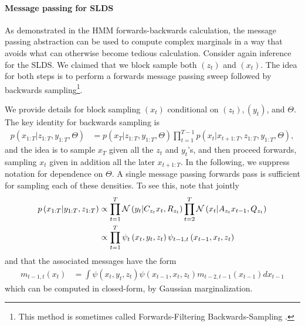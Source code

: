 \paragraph{Message passing for SLDS}

As demonstrated in the HMM forwards-backwards calculation, the message passing
abstraction can be used to compute complex marginals in a way that avoids what
can otherwise become tedious calculation. Consider again inference for the SLDS.
We claimed that we block sample both $\left(z_t\right)$ and $\left(x_t\right)$.
The idea for both steps is to perform a forwards message passing sweep followed
by backwards sampling\footnote{This method is sometimes called
  Forwards-Filtering Backwards-Sampling \citep{carter1994gibbs}.}.

We provide details for block sampling $\left(x_t\right)$ conditional on
$\left(z_t\right), \left(y_t\right)$, and $\Theta$. The key identity for
backwards sampling is
\begin{align*}
  p\left(x_{1:T} \vert z_{1:T}, y_{1:T}, \Theta\right) &= p\left(x_{T} \vert z_{1:T}, y_{1:T}, \Theta\right) \prod_{t = 1}^{T - 1} p\left(x_{t} \vert x_{t + 1:T}, z_{1:T}, y_{1:T}, \Theta\right),
\end{align*}
and the idea is to sample $x_{T}$ given all the $z_{t}$ and $y_{t}$'s, and then
proceed forwards, sampling $x_{t}$ given in addition all the later $x_{t +
  1:T}$. In the following, we suppress notation for dependence on $\Theta$. A
single message passing forwards pass is sufficient for sampling each of these
densities. To see this, note that jointly
\begin{align*}
  p\left(x_{1:T} \vert y_{1:T}, z_{1:T}\right) &\propto
  \prod_{t = 1}^{T} \mathcal{N}\left(y_t \vert C_{z_t} x_t, R_{z_t}\right) \prod_{t = 2}^{T} \mathcal{N}\left(x_{t} \vert A_{z_t} x_{t - 1}, Q_{z_t}\right) \\
    &\propto\prod_{t = 1}^{T} \psi_{t}\left(x_{t}, y_{t}, z_{t}\right) \psi_{t - 1, t}\left(x_{t - 1}, x_{t}, z_{t}\right)
\end{align*}
and that the associated messages have the form
\begin{align*}
  m_{t - 1, t}\left(x_t\right) &= \int \psi\left(x_{t} , y_t, z_t\right)\psi\left(x_{t - 1}, x_t, z_t\right) m_{t - 2, t - 1}\left(x_{t - 1}\right) dx_{t - 1}
\end{align*}
which can be computed in closed-form, by Gaussian marginalization.

